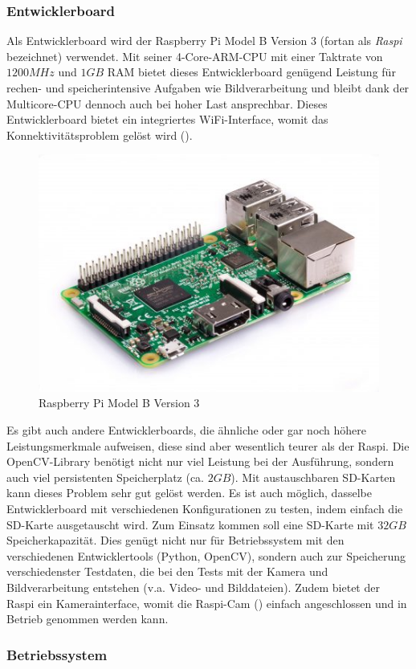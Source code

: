 \subsubsection{Entwicklerboard}

Als Entwicklerboard wird der Raspberry Pi Model B Version 3 (fortan als \textit{Raspi} bezeichnet) verwendet. Mit seiner 4-Core-ARM-CPU mit einer Taktrate von $1200 MHz$ und $1 GB$ RAM  bietet dieses Entwicklerboard genügend Leistung für rechen- und speicherintensive Aufgaben wie Bildverarbeitung und bleibt dank der Multicore-CPU dennoch auch bei hoher Last ansprechbar. Dieses Entwicklerboard bietet ein integriertes WiFi-Interface, womit das Konnektivitätsproblem gelöst wird ().

\begin{figure}
    \centering
    \includegraphics[width=0.5\linewidth]{pics/raspi.jpg}
    \caption{Raspberry Pi Model B Version 3}
    \label{fig:raspi}
\end{figure}

Es gibt auch andere Entwicklerboards, die ähnliche oder gar noch höhere Leistungsmerkmale aufweisen, diese sind aber wesentlich teurer als der Raspi. Die OpenCV-Library benötigt nicht nur viel Leistung bei der Ausführung, sondern auch viel persistenten Speicherplatz (ca. $2 GB$). Mit austauschbaren SD-Karten kann dieses Problem sehr gut gelöst werden. Es ist auch möglich, dasselbe Entwicklerboard mit verschiedenen Konfigurationen zu testen, indem einfach die SD-Karte ausgetauscht wird. Zum Einsatz kommen soll eine SD-Karte mit $32 GB$ Speicherkapazität. Dies genügt nicht nur für Betriebssystem mit den verschiedenen Entwicklertools (Python, OpenCV), sondern auch zur Speicherung verschiedenster Testdaten, die bei den Tests mit der Kamera und Bildverarbeitung entstehen (v.a. Video- und Bilddateien). Zudem bietet der Raspi ein Kamerainterface, womit die Raspi-Cam () einfach angeschlossen und in Betrieb genommen werden kann.

\subsubsection{Betriebssystem}

